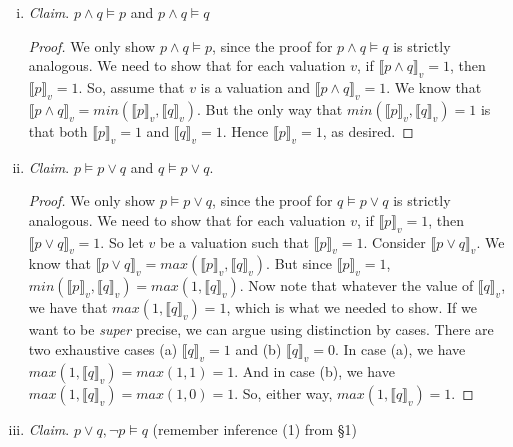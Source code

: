 \begin{enumerate}[\thesection.1]
\begin{enumerate}[(i)]
			\item \emph{Claim}. $p\land q\vDash p$ and $p\land q\vDash q$
			
			\begin{proof}
			We only show $p\land q\vDash p$, since the proof for  $p\land q\vDash q$
			is strictly analogous. We need to show that for each valuation $v$, if
			$\llbracket p\land q\rrbracket_v=1$, then $\llbracket p\rrbracket_v=1$.
			So, assume that $v$ is a valuation and $\llbracket p\land
			q\rrbracket_v=1$. We know that $\llbracket p\land
			q\rrbracket_v=min(\llbracket p\rrbracket_v, \llbracket q\rrbracket_v)$.
			But the only way that $min(\llbracket p\rrbracket_v, \llbracket
			q\rrbracket_v)=1$ is that both $\llbracket p\rrbracket_v=1$ and
			$\llbracket q\rrbracket_v=1$. Hence $\llbracket p\rrbracket_v=1$, as
			desired.
			\end{proof}
			
			\item \emph{Claim}. $p\vDash p\lor q$ and $q\vDash p\lor q$.
			
			\begin{proof}
			We only show $p\vDash p\lor q$, since the proof for $q\vDash p\lor q$ is
			strictly analogous. We need to show that for each valuation $v$, if
			$\llbracket p\rrbracket_v=1$, then $\llbracket p\lor q\rrbracket_v=1$. So
			let $v$ be a valuation such that $\llbracket p\rrbracket_v=1$. Consider
			$\llbracket p\lor q\rrbracket_v$. We know that $\llbracket p\lor
			q\rrbracket_v=max(\llbracket p\rrbracket_v,\llbracket q\rrbracket_v)$.
			But since $\llbracket p\rrbracket_v=1$, $min(\llbracket
			p\rrbracket_v,\llbracket q\rrbracket_v)=max(1, \llbracket
			q\rrbracket_v)$. Now note that whatever the value of $\llbracket
			q\rrbracket_v$, we have that $max(1, \llbracket q\rrbracket_v)=1$, which
			is what we needed to show. If we want to be \emph{super} precise, we can
			argue using distinction by cases. There are two exhaustive cases (a)
			$\llbracket q\rrbracket_v=1$ and (b) $\llbracket q\rrbracket_v=0$. In
			case (a), we have $max(1, \llbracket q\rrbracket_v)=max(1,1)=1$. And in
			case (b), we have $max(1, \llbracket q\rrbracket_v)=max(1,0)=1$. So,
			either way, $max(1, \llbracket q\rrbracket_v)=1$.
			\end{proof}
			
			\item \emph{Claim}. $p\lor q, \neg p\vDash q$ (remember inference (1) from \S1)
			

\end{enumerate}
\end{enumerate}
